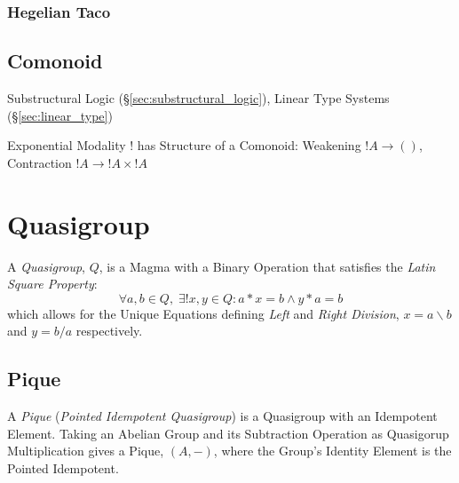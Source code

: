\subsubsection{Hegelian Taco}\label{sec:hegelian_taco}



\subsection{Comonoid}\label{sec:comonoid}

Substructural Logic (\S\ref{sec:substructural_logic}), Linear Type
Systems (\S\ref{sec:linear_type})

Exponential Modality $!$ has Structure of a Comonoid: Weakening $!A
\rightarrow ()$, Contraction $!A \rightarrow !A \times !A$



\section{Quasigroup}\label{sec:quasigroup}

A \emph{Quasigroup}, $Q$, is a Magma with a Binary Operation that satisfies
the \emph{Latin Square Property}:
\[
  \forall a, b \in Q,\;\exists ! x,y \in Q : a * x = b \wedge y * a = b
\]
which allows for the Unique Equations defining \emph{Left} and
\emph{Right Division}, $x = a \backslash b$ and $y = b / a$
respectively.



\subsection{Pique}\label{sec:pique}

A \emph{Pique} (\emph{Pointed Idempotent Quasigroup}) is a Quasigroup
with an Idempotent Element. Taking an Abelian Group and its
Subtraction Operation as Quasigorup Multiplication gives a Pique,
$(A,-)$, where the Group's Identity Element is the Pointed Idempotent.



